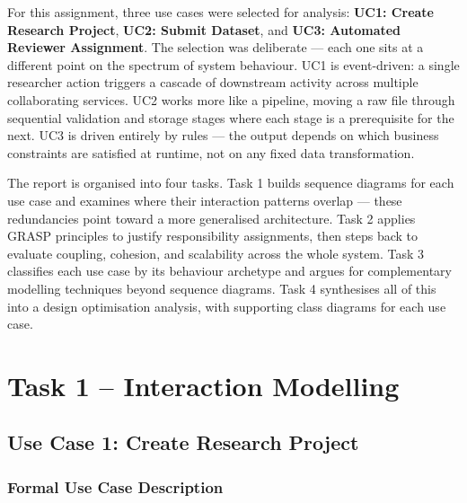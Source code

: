 \documentclass[12pt,a4paper]{article}
\begin{document}
For this assignment, three use cases were selected for analysis: \textbf{UC1: Create Research Project}, \textbf{UC2: Submit Dataset}, and \textbf{UC3: Automated Reviewer Assignment}. The selection was deliberate --- each one sits at a different point on the spectrum of system behaviour. UC1 is event-driven: a single researcher action triggers a cascade of downstream activity across multiple collaborating services. UC2 works more like a pipeline, moving a raw file through sequential validation and storage stages where each stage is a prerequisite for the next. UC3 is driven entirely by rules --- the output depends on which business constraints are satisfied at runtime, not on any fixed data transformation.

The report is organised into four tasks. Task 1 builds sequence diagrams for each use case and examines where their interaction patterns overlap --- these redundancies point toward a more generalised architecture. Task 2 applies GRASP principles to justify responsibility assignments, then steps back to evaluate coupling, cohesion, and scalability across the whole system. Task 3 classifies each use case by its behaviour archetype and argues for complementary modelling techniques beyond sequence diagrams. Task 4 synthesises all of this into a design optimisation analysis, with supporting class diagrams for each use case.

\section{Task 1 -- Interaction Modelling}

\subsection{Use Case 1: Create Research Project}

\subsubsection{Formal Use Case Description}
\end{document}
